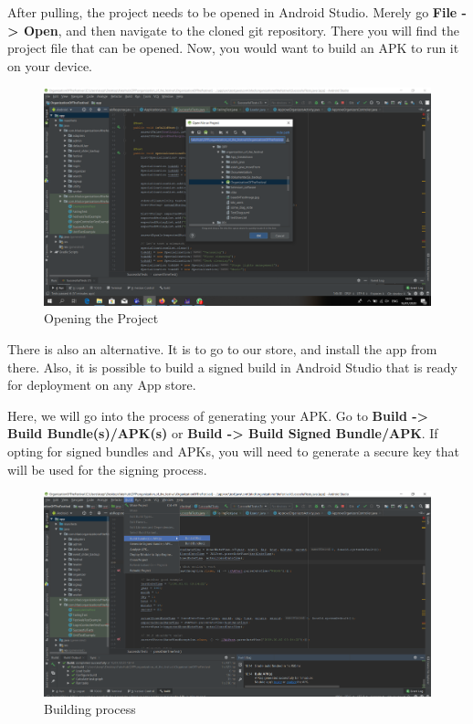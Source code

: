 			After pulling, the project needs to be opened in Android Studio. Merely go \textbf{File -> Open}, and then navigate to the cloned git repository. There you will find the project file that can be opened. Now, you would want to build an APK to run it on your device.
			
			\begin{figure}[H]
				\includegraphics[width=\linewidth]{images/Deploy_M_2.png}
				\caption{Opening the Project}
				\label{fig:install_2}
			\end{figure}
			
			There is also an alternative. It is to go to our store, and install the app from there. Also, it is possible to build a signed build in Android Studio that is ready for deployment on any App store.
			
			Here, we will go into the process of generating your APK. Go to \textbf{Build -> Build Bundle(s)/APK(s)} or \textbf{Build -> Build Signed Bundle/APK}. If opting for signed bundles and APKs, you will need to generate a secure key that will be used for the signing process.
			
			\begin{figure}[H]
				\includegraphics[width=\linewidth]{images/Deploy_M_3.png}
				\caption{Building process}
				\label{fig:install_3}
			\end{figure}
			
